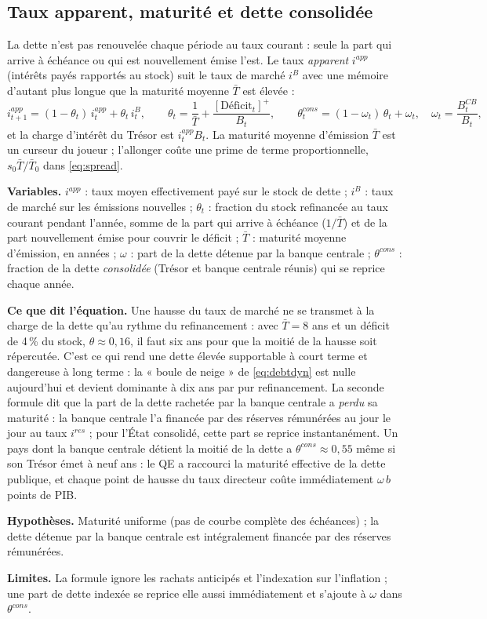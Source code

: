 \documentclass[11pt,a4paper]{article}
\newcommand{\og}{« }
\newcommand{\fg}{ »}
\newcommand{\variables}{\par\noindent\textbf{Variables.} }
\newcommand{\sens}{\par\noindent\textbf{Ce que dit l'équation.} }
\newcommand{\hyp}{\par\noindent\textbf{Hypothèses.} }
\newcommand{\limites}{\par\noindent\textbf{Limites.} }
\newcommand{\pos}[1]{{\left[#1\right]^{+}}}
\begin{document}
\subsection{Taux apparent, maturité et dette consolidée}
\label{sec:iapp}
La dette n'est pas renouvelée chaque période au taux courant : seule la part qui arrive à échéance ou qui est nouvellement émise l'est. Le taux \emph{apparent} $i^{app}$ (intérêts payés rapportés au stock) suit le taux de marché $i^B$ avec une mémoire d'autant plus longue que la maturité moyenne $\bar T$ est élevée :
\begin{equation}
i^{app}_{t+1} = (1-\theta_t)\, i^{app}_t + \theta_t\, i^B_t, \qquad
\theta_t = \frac{1}{\bar T} + \frac{\pos{\text{Déficit}_t}}{B_t}, \qquad
\theta^{cons}_t = (1-\omega_t)\,\theta_t + \omega_t, \quad \omega_t = \frac{B^{CB}_t}{B_t},
\label{eq:iapp}
\end{equation}
et la charge d'intérêt du Trésor est $i^{app}_t B_t$. La maturité moyenne d'émission $\bar T$ est un curseur du joueur ; l'allonger coûte une prime de terme proportionnelle, $s_0\bar T/\bar T_0$ dans \eqref{eq:spread}.
\begin{lecture}
\variables $i^{app}$ : taux moyen effectivement payé sur le stock de dette ; $i^B$ : taux de marché sur les émissions nouvelles ; $\theta_t$ : fraction du stock refinancée au taux courant pendant l'année, somme de la part qui arrive à échéance ($1/\bar T$) et de la part nouvellement émise pour couvrir le déficit ; $\bar T$ : maturité moyenne d'émission, en années ; $\omega$ : part de la dette détenue par la banque centrale ; $\theta^{cons}$ : fraction de la dette \emph{consolidée} (Trésor et banque centrale réunis) qui se reprice chaque année.
\sens Une hausse du taux de marché ne se transmet à la charge de la dette qu'au rythme du refinancement : avec $\bar T=8$ ans et un déficit de 4\,\% du stock, $\theta\approx0{,}16$, il faut six ans pour que la moitié de la hausse soit répercutée. C'est ce qui rend une dette élevée supportable à court terme et dangereuse à long terme : la \og boule de neige\fg{} de \eqref{eq:debtdyn} est nulle aujourd'hui et devient dominante à dix ans par pur refinancement. La seconde formule dit que la part de la dette rachetée par la banque centrale a \emph{perdu} sa maturité : la banque centrale l'a financée par des réserves rémunérées au jour le jour au taux $i^{res}$ ; pour l'État consolidé, cette part se reprice instantanément. Un pays dont la banque centrale détient la moitié de la dette a $\theta^{cons}\approx0{,}55$ même si son Trésor émet à neuf ans : le QE a raccourci la maturité effective de la dette publique, et chaque point de hausse du taux directeur coûte immédiatement $\omega\, b$ points de PIB.
\hyp Maturité uniforme (pas de courbe complète des échéances) ; la dette détenue par la banque centrale est intégralement financée par des réserves rémunérées.
\limites La formule ignore les rachats anticipés et l'indexation sur l'inflation ; une part de dette indexée se reprice elle aussi immédiatement et s'ajoute à $\omega$ dans $\theta^{cons}$.
\end{lecture}
\end{document}
